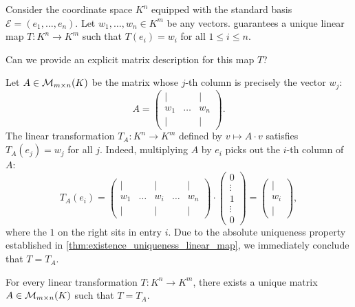 \begin{example}
\label{ex:linear_map_std_basis}
Consider the coordinate space $K^n$ equipped with the standard basis $\mathcal{E} = (e_1, \dots, e_n)$. Let $w_1, \dots, w_n \in K^m$ be any vectors.  guarantees a unique linear map $T: K^n \to K^m$ such that $T(e_i) = w_i$ for all $1 \le i \le n$.

\begin{question}
Can we provide an explicit matrix description for this map $T$?
\end{question}

\begin{answer}
Let $A \in \mathcal{M}_{m \times n}(K)$ be the matrix whose $j$-th column is precisely the vector $w_j$:
\[
A = 
\begin{pmatrix}
| & & | \\
w_1 & \dots & w_n \\
| & & |
\end{pmatrix}.
\]
The linear transformation $T_A: K^n \to K^m$ defined by $v \mapsto A \cdot v$ satisfies $T_A(e_j) = w_j$ for all $j$.
Indeed, multiplying $A$ by $e_i$ picks out the $i$-th column of $A$:
\[
T_A(e_i) = \begin{pmatrix} | & & | & & | \\ w_1 & \dots & w_i & \dots & w_n \\ | & & | & & | \end{pmatrix} \cdot \begin{pmatrix} 0 \\ \vdots \\ 1 \\ \vdots \\ 0 \end{pmatrix} = \begin{pmatrix} | \\ w_i \\ | \end{pmatrix},
\]
where the $1$ on the right sits in entry $i$.
Due to the absolute uniqueness property established in \cref{thm:existence_uniqueness_linear_map}, we immediately conclude that $T = T_A$.
\end{answer}
\end{example}

\begin{lemma}
\label{lem:all_linear_maps_are_matrices}
For every linear transformation $T: K^n \to K^m$, there exists a unique matrix $A \in \mathcal{M}_{m \times n}(K)$ such that $T = T_A$.
\end{lemma}

